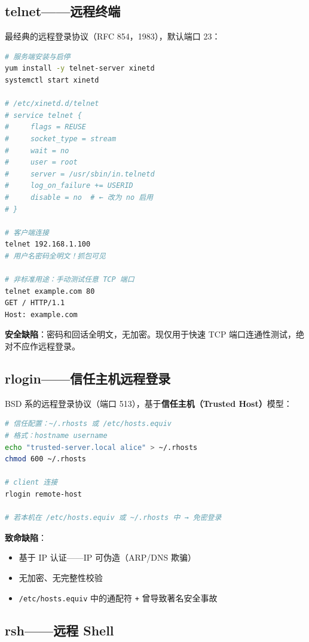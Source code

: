 \documentclass[12pt,UTF8]{ctexbook}
\begin{document}
\subsection{telnet——远程终端}

最经典的远程登录协议（RFC 854，1983），默认端口 23：

\begin{lstlisting}[language=bash]
# 服务端安装与启停
yum install -y telnet-server xinetd
systemctl start xinetd

# /etc/xinetd.d/telnet
# service telnet {
#     flags = REUSE
#     socket_type = stream
#     wait = no
#     user = root
#     server = /usr/sbin/in.telnetd
#     log_on_failure += USERID
#     disable = no  # ← 改为 no 启用
# }

# 客户端连接
telnet 192.168.1.100
# 用户名密码全明文！抓包可见

# 非标准用途：手动测试任意 TCP 端口
telnet example.com 80
GET / HTTP/1.1
Host: example.com
\end{lstlisting}

\textbf{安全缺陷}：密码和回话全明文，无加密。现仅用于快速 TCP 端口连通性测试，绝对不应作远程登录。

\subsection{rlogin——信任主机远程登录}

BSD 系的远程登录协议（端口 513），基于\textbf{信任主机（Trusted Host）}模型：

\begin{lstlisting}[language=bash]
# 信任配置：~/.rhosts 或 /etc/hosts.equiv
# 格式：hostname username
echo "trusted-server.local alice" > ~/.rhosts
chmod 600 ~/.rhosts

# client 连接
rlogin remote-host

# 若本机在 /etc/hosts.equiv 或 ~/.rhosts 中 → 免密登录
\end{lstlisting}

\textbf{致命缺陷}：
\begin{itemize}
    \item 基于 IP 认证——IP 可伪造（ARP/DNS 欺骗）
    \item 无加密、无完整性校验
    \item \texttt{/etc/hosts.equiv} 中的通配符 \texttt{+} 曾导致著名安全事故
\end{itemize}

\subsection{rsh——远程 Shell}
\end{document}
